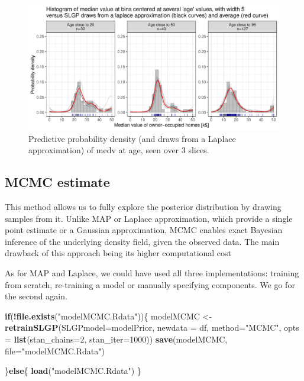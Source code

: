\documentclass[
]{article}
\newenvironment{Shaded}{\begin{snugshade}}{\end{snugshade}}
\newcommand{\AttributeTok}[1]{\textcolor[rgb]{0.13,0.29,0.53}{#1}}
\newcommand{\ControlFlowTok}[1]{\textcolor[rgb]{0.13,0.29,0.53}{\textbf{#1}}}
\newcommand{\DecValTok}[1]{\textcolor[rgb]{0.00,0.00,0.81}{#1}}
\newcommand{\FunctionTok}[1]{\textcolor[rgb]{0.13,0.29,0.53}{\textbf{#1}}}
\newcommand{\NormalTok}[1]{#1}
\newcommand{\OtherTok}[1]{\textcolor[rgb]{0.56,0.35,0.01}{#1}}
\newcommand{\SpecialCharTok}[1]{\textcolor[rgb]{0.81,0.36,0.00}{\textbf{#1}}}
\newcommand{\StringTok}[1]{\textcolor[rgb]{0.31,0.60,0.02}{#1}}
\begin{document}
\begin{figure}[H]

{\centering \includegraphics{IntroductionSLGP_files/figure-latex/SLGPLaplaceplot-1} 

}

\caption{Predictive probability density (and draws from a Laplace approximation) of medv at age, seen over 3 slices.}\label{fig:SLGPLaplaceplot}
\end{figure}

\subsection{MCMC estimate}\label{mcmc-estimate}

This method allows us to fully explore the posterior distribution by drawing samples from it. Unlike MAP or Laplace approximation, which provide a single point estimate or a Gaussian approximation, MCMC enables exact Bayesian inference of the underlying density field, given the observed data. The main drawback of this approach being its higher computational cost

As for MAP and Laplace, we could have used all three implementations: training from scratch, re-training a model or manually specifying components. We go for the second again.

\begin{Shaded}
\begin{Highlighting}[]
\ControlFlowTok{if}\NormalTok{(}\SpecialCharTok{!}\FunctionTok{file.exists}\NormalTok{(}\StringTok{"modelMCMC.Rdata"}\NormalTok{))\{}
\NormalTok{  modelMCMC  }\OtherTok{\textless{}{-}} \FunctionTok{retrainSLGP}\NormalTok{(}\AttributeTok{SLGPmodel=}\NormalTok{modelPrior, }
                            \AttributeTok{newdata =}\NormalTok{ df, }
                            \AttributeTok{method=}\StringTok{"MCMC"}\NormalTok{,}
                            \AttributeTok{opts =} \FunctionTok{list}\NormalTok{(}\AttributeTok{stan\_chains=}\DecValTok{2}\NormalTok{, }\AttributeTok{stan\_iter=}\DecValTok{1000}\NormalTok{))}
  \FunctionTok{save}\NormalTok{(modelMCMC, }\AttributeTok{file=}\StringTok{"modelMCMC.Rdata"}\NormalTok{)}
  
\NormalTok{\}}\ControlFlowTok{else}\NormalTok{\{}
  \FunctionTok{load}\NormalTok{(}\StringTok{"modelMCMC.Rdata"}\NormalTok{)}
\NormalTok{\}}
\end{Highlighting}
\end{Shaded}
\end{document}
